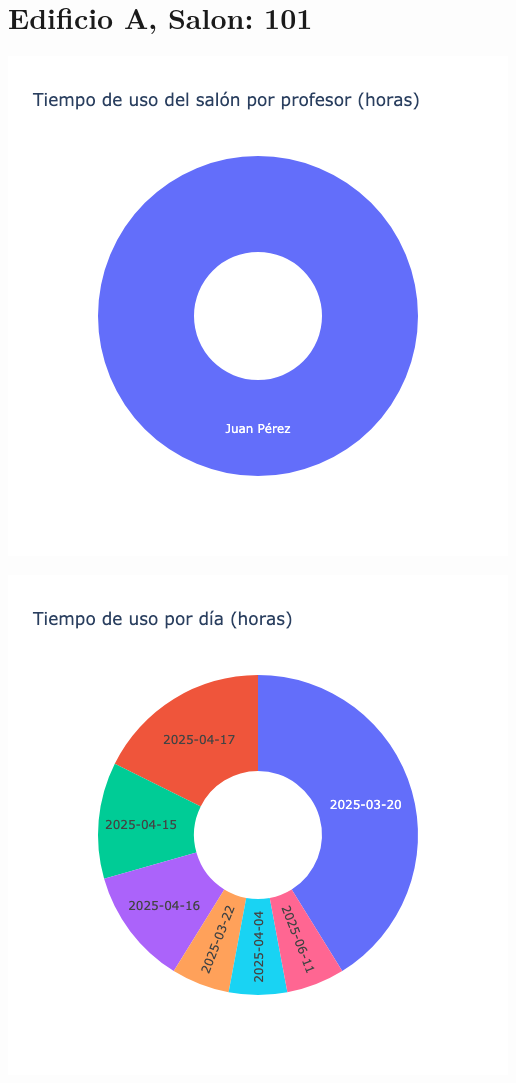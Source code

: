 \documentclass{article}
\begin{document}
    \section{Edificio A, Salon: 101}
    \noindent
    \begin{minipage}{0.48\textwidth}
        \centering
        \includegraphics[width=\textwidth]{../img/pie/UP101-180Dias-24-08-2025.png}
    \end{minipage}
    \hfill
    \begin{minipage}{0.48\textwidth}
        \centering
        \includegraphics[width=\textwidth]{../img/pie/UD101-180Dias-24-08-2025.png}
    \end{minipage}
    
\end{document}
